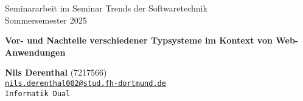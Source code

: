 \documentclass{article}
\begin{document}
\begin{titlepage}
    \begin{center}
        \vspace*{1cm}

        \LARGE Seminararbeit im Seminar Trends der Softwaretechnik \\
        \large Sommersemester 2025

        \vspace{1.5cm}

        \huge
        \textbf{Vor- und Nachteile verschiedener Typsysteme im Kontext von Web-Anwendungen}

        \vspace{3cm}

        \large
        \textbf{Nils Derenthal} (7217566) \\
        \def\email{nils.derenthal002@stud.fh-dortmund.de}\tt\href{mailto:\email}{\email} \\
        Informatik Dual

        \vfill
    \end{center}
\end{titlepage}

\tableofcontents

\newpage







\end{document}

